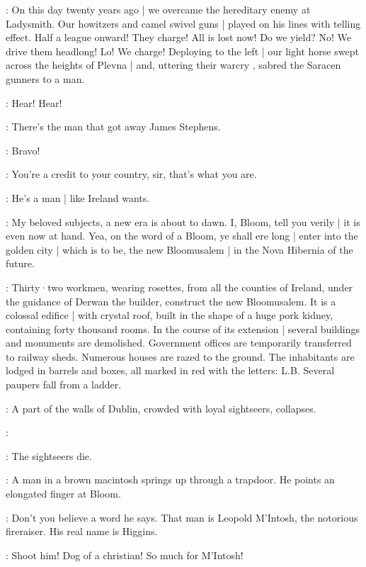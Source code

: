 \Bloom:
On this day twenty years ago |
we overcame the hereditary enemy at Ladysmith.
Our howitzers and camel swivel guns |
played on his lines with telling effect.
Half a league onward!
They charge!
All is lost now!
Do we yield?
No!
We drive them headlong!
Lo!
We charge!
Deploying to the left |
our light horse swept across the heights of Plevna |
and,
uttering their warcry ,
sabred the Saracen gunners to a man.

\Typesetters[1]:
Hear!
Hear!

\JohnWyse[2]:
There's the man that got away James Stephens.

\Bluecoat[1]:
Bravo!

\OldResident[2]:
You're a credit to your country,
sir,
that's what you are.

\AppleWoman[1]:
He's a man |
like Ireland wants.

\Bloom:
My beloved subjects,
a new era is about to dawn.
I,
Bloom,
tell you verily |
it is even now at hand.
Yea,
on the word of a Bloom,
ye shall ere long |
enter into the golden city |
which is to be,
the new Bloomusalem |
in the Nova Hibernia of the future.

:
Thirty·two workmen,
wearing rosettes,
from all the counties of Ireland,
under the guidance of Derwan the builder,
construct the new Bloomusalem.
It is a colossal edifice |
with crystal roof,
built in the shape of a huge pork kidney,
containing forty thousand rooms.
In the course of its extension |
several buildings and monuments are demolished.
Government offices are temporarily transferred to railway sheds.
Numerous houses are razed to the ground.
The inhabitants are lodged in barrels and boxes,
all marked in red with the letters:
L.B.
Several paupers fall from a ladder.

:
A part of the walls of Dublin,
crowded with loyal sightseers,
collapses.

\Sightseers:

\sout{}

:
The sightseers die.

:
A man in a brown macintosh springs up through a trapdoor.
He points an elongated finger at Bloom.

\Macintosh:
Don't you believe a word he says.
That man is Leopold M'Intosh,
the notorious fireraiser.
His real name is Higgins.

\Bloom:
Shoot him!
Dog of a christian!
So much for M'Intosh!

